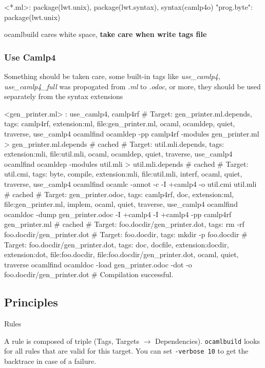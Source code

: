 \begin{bashcode}
<*.ml>: package(lwt.unix), package(lwt.syntax), syntax(camlp4o)
"prog.byte": package(lwt.unix)
\end{bashcode}

ocamlbuild cares white space, \textbf{ take care when write tags file}
\subsubsection{Use Camlp4}

Something should be taken care, some built-in tags like
\textit{use\_camlp4}, \textit{use\_camlp4\_full} was propogated
from \textit{.ml} to \textit{.odoc}, or more, they should be
used separately from the syntax extensions

\begin{bashcode}
  <gen_printer.ml> : use_camlp4, camlp4rf
  # Target: gen_printer.ml.depends, tags: { camlp4rf, extension:ml, file:gen_printer.ml, ocaml, ocamldep, quiet, traverse, use_camlp4 }
ocamlfind ocamldep -pp camlp4rf -modules gen_printer.ml > gen_printer.ml.depends # cached
  # Target: util.mli.depends, tags: { extension:mli, file:util.mli, ocaml, ocamldep, quiet, traverse, use_camlp4 }
ocamlfind ocamldep -modules util.mli > util.mli.depends # cached
  # Target: util.cmi, tags: { byte, compile, extension:mli, file:util.mli, interf, ocaml, quiet, traverse, use_camlp4 }
ocamlfind ocamlc -annot -c -I +camlp4 -o util.cmi util.mli # cached
  # Target: gen_printer.odoc, tags: { camlp4rf, doc, extension:ml, file:gen_printer.ml, implem, ocaml, quiet, traverse, use_camlp4 }
ocamlfind ocamldoc -dump gen_printer.odoc -I +camlp4 -I +camlp4 -pp camlp4rf gen_printer.ml # cached
  # Target: foo.docdir/gen_printer.dot, tags: {  }
  rm -rf foo.docdir/gen_printer.dot
# Target: foo.docdir, tags: {  }
mkdir -p foo.docdir
# Target: foo.docdir/gen_printer.dot, tags: { doc, docfile, extension:docdir, extension:dot, file:foo.docdir, file:foo.docdir/gen_printer.dot, ocaml, quiet, traverse }
ocamlfind ocamldoc -load gen_printer.odoc -dot -o foo.docdir/gen_printer.dot
# Compilation successful.
\end{bashcode}

\subsection{Principles}
Rules 

A rule is composed of triple (Tags, Targets $\rightarrow$ Dependencies).
\verb|ocamlbuild| looks for all rules that are valid for this target.
You can set \verb|-verbose 10| to get the backtrace in case of a
failure.

